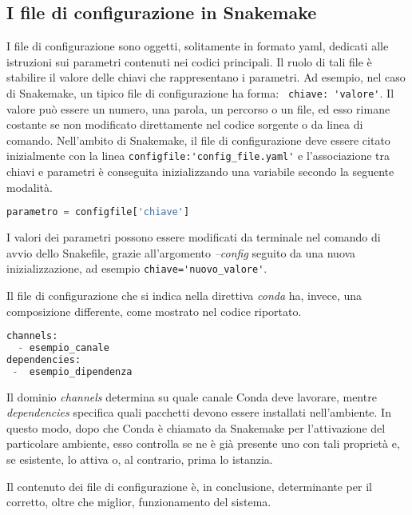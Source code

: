 \subsection{I file di configurazione in Snakemake}
I file di configurazione sono oggetti, solitamente in formato yaml, dedicati alle istruzioni sui parametri contenuti nei codici principali.
Il ruolo di tali file è stabilire il valore delle chiavi che rappresentano i parametri.
Ad esempio, nel caso di Snakemake, un tipico file di configurazione ha forma: \verb! chiave: 'valore'!.
Il valore può essere un numero, una parola, un percorso o un file, ed esso rimane costante se non modificato direttamente nel codice sorgente o da linea di comando.
 Nell'ambito di Snakemake, il file di configurazione deve essere citato inizialmente con la linea \verb!configfile:'config_file.yaml'! e l'associazione tra chiavi e parametri è conseguita inizializzando una variabile secondo la seguente modalità.
\begin{lstlisting}[language=Python]
parametro = configfile['chiave']
\end{lstlisting}
I valori dei parametri possono essere modificati da terminale nel comando di avvio dello Snakefile, grazie all'argomento \textit{--config} seguito da una nuova inizializzazione, ad esempio \verb!chiave='nuovo_valore'!.

Il file di configurazione che si indica nella direttiva \textit{conda} ha, invece, una composizione differente, come mostrato nel codice riportato.
\begin{lstlisting}[language=Python]
channels:
  - esempio_canale
dependencies:
 -  esempio_dipendenza
\end{lstlisting}
Il dominio \textit{channels} determina su quale canale Conda deve lavorare, mentre \textit{dependencies} specifica quali pacchetti devono essere installati nell'ambiente.
In questo modo, dopo che Conda è chiamato da Snakemake per l'attivazione del particolare ambiente, esso controlla se ne è già presente uno con tali proprietà e, se esistente, lo attiva o, al contrario, prima lo istanzia.

Il contenuto dei file di configurazione è, in conclusione, determinante per il corretto, oltre che miglior, funzionamento del sistema.

